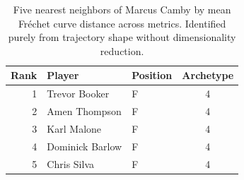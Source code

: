 \begin{table}[htbp]
  \centering\small
  \begin{tabular}{rllc}
    \toprule
    Rank & Player & Position & Archetype \\
    \midrule
    1 & Trevor Booker & F & 4 \\
    2 & Amen Thompson & F & 4 \\
    3 & Karl Malone & F & 4 \\
    4 & Dominick Barlow & F & 4 \\
    5 & Chris Silva & F & 4 \\
    \bottomrule
  \end{tabular}
  \caption{Five nearest neighbors of Marcus Camby by mean Fr\'{e}chet curve distance across metrics. Identified purely from trajectory shape without dimensionality reduction.}
  \label{tab:Marcus_Camby_frechet_curve_neighbors}
\end{table}

